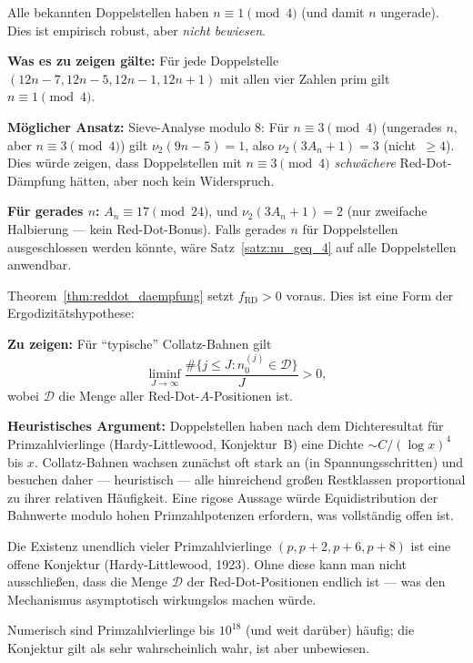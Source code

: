 \documentclass[12pt,a4paper]{article}
\newcommand{\vii}{\nu_2}
\begin{document}
\begin{tcolorbox}[lücke, title={Offene Frage 1: Muss $n \equiv 1 \pmod{4}$ für alle Doppelstellen gelten?}]
Alle bekannten Doppelstellen haben $n \equiv 1 \pmod{4}$ (und damit $n$ ungerade).
Dies ist empirisch robust, aber \emph{nicht bewiesen}.

\medskip
\textbf{Was es zu zeigen gälte:}
Für jede Doppelstelle $(12n-7, 12n-5, 12n-1, 12n+1)$ mit allen vier Zahlen prim
gilt $n \equiv 1 \pmod{4}$.

\medskip
\textbf{Möglicher Ansatz:}
Sieve-Analyse modulo $8$: Für $n \equiv 3 \pmod{4}$ (ungerades $n$, aber
$n \equiv 3 \pmod 4$) gilt $\vii(9n-5) = 1$, also $\vii(3A_n+1) = 3$
(nicht~$\geq 4$). Dies würde zeigen, dass Doppelstellen mit $n \equiv 3 \pmod 4$
\emph{schwächere} Red-Dot-Dämpfung hätten, aber noch kein Widerspruch.

\medskip
\textbf{Für gerades $n$:} $A_n \equiv 17 \pmod{24}$, und
$\vii(3A_n+1) = 2$ (nur zweifache Halbierung --- kein Red-Dot-Bonus).
Falls gerades $n$ für Doppelstellen ausgeschlossen werden könnte,
wäre Satz~\ref{satz:nu_geq_4} auf alle Doppelstellen anwendbar.
\end{tcolorbox}

\begin{tcolorbox}[lücke, title={Offene Frage 2: Besuchen Collatz-Bahnen Doppelstellen mit positiver Häufigkeit?}]
Theorem~\ref{thm:reddot_daempfung} setzt $f_{\mathrm{RD}} > 0$ voraus.
Dies ist eine Form der Ergodizitätshypothese:

\medskip
\textbf{Zu zeigen:}
Für ``typische'' Collatz-Bahnen gilt
\[
  \liminf_{J\to\infty}
  \frac{\#\{j \leq J : n_0^{(j)} \in \mathcal{D}\}}{J}
  > 0,
\]
wobei $\mathcal{D}$ die Menge aller Red-Dot-$A$-Positionen ist.

\medskip
\textbf{Heuristisches Argument:}
Doppelstellen haben nach dem Dichteresultat für Primzahlvierlinge
(Hardy-Littlewood, Konjektur~B) eine Dichte $\sim C/(\log x)^4$ bis $x$.
Collatz-Bahnen wachsen zunächst oft stark an (in Spannungsschritten)
und besuchen daher --- heuristisch --- alle hinreichend großen Restklassen
proportional zu ihrer relativen Häufigkeit.
Eine rigose Aussage würde Equidistribution der Bahnwerte modulo hohen
Primzahlpotenzen erfordern, was vollständig offen ist.
\end{tcolorbox}

\begin{tcolorbox}[lücke, title={Offene Frage 3: Gibt es unendlich viele Doppelstellen?}]
Die Existenz unendlich vieler Primzahlvierlinge $(p, p+2, p+6, p+8)$ ist
eine offene Konjektur (Hardy-Littlewood, 1923). Ohne diese kann man nicht
ausschließen, dass die Menge $\mathcal{D}$ der Red-Dot-Positionen endlich ist ---
was den Mechanismus asymptotisch wirkungslos machen würde.

\medskip
Numerisch sind Primzahlvierlinge bis $10^{18}$ (und weit darüber) häufig;
die Konjektur gilt als sehr wahrscheinlich wahr, ist aber unbewiesen.
\end{tcolorbox}
\end{document}
